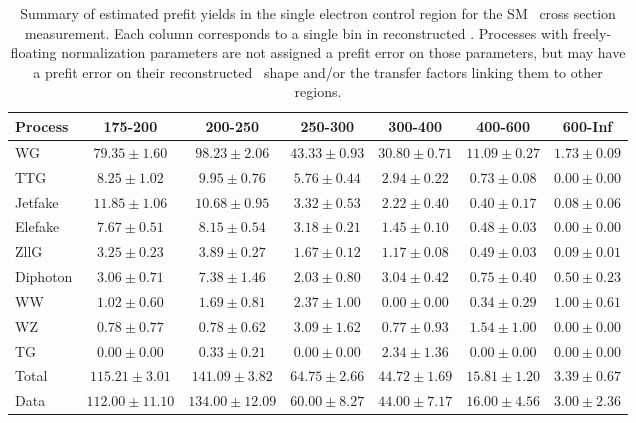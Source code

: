 \begin{table}[htbp]
  \begin{center}
    \caption{Summary of estimated prefit yields in the single electron control region for the SM \zinvg\ cross section measurement.
    Each column corresponds to a single bin in reconstructed \ETgamma. Processes with freely-floating normalization parameters
    are not assigned a prefit error on those parameters, but may have a prefit error on their reconstructed \ETgamma\ shape
    and/or the transfer factors linking them to other regions.}
    \label{tab:BkgSummaryMonoel_prefit}
    \begin{tabular}{|l|c|c|c|c|c|c|}
      \hline
      Process & 175-200 & 200-250 & 250-300 & 300-400 & 400-600 & 600-Inf \\
      \hline
      WG & $79.35{\pm}1.60$ & $98.23{\pm}2.06$ & $43.33{\pm}0.93$ & $30.80{\pm}0.71$ & $11.09{\pm}0.27$ & $1.73{\pm}0.09$ \\
      TTG & $8.25{\pm}1.02$ & $9.95{\pm}0.76$ & $5.76{\pm}0.44$ & $2.94{\pm}0.22$ & $0.73{\pm}0.08$ & $0.00{\pm}0.00$ \\
      Jetfake & $11.85{\pm}1.06$ & $10.68{\pm}0.95$ & $3.32{\pm}0.53$ & $2.22{\pm}0.40$ & $0.40{\pm}0.17$ & $0.08{\pm}0.06$ \\
      Elefake & $7.67{\pm}0.51$ & $8.15{\pm}0.54$ & $3.18{\pm}0.21$ & $1.45{\pm}0.10$ & $0.48{\pm}0.03$ & $0.00{\pm}0.00$ \\
      ZllG & $3.25{\pm}0.23$ & $3.89{\pm}0.27$ & $1.67{\pm}0.12$ & $1.17{\pm}0.08$ & $0.49{\pm}0.03$ & $0.09{\pm}0.01$ \\
      Diphoton & $3.06{\pm}0.71$ & $7.38{\pm}1.46$ & $2.03{\pm}0.80$ & $3.04{\pm}0.42$ & $0.75{\pm}0.40$ & $0.50{\pm}0.23$ \\
      WW & $1.02{\pm}0.60$ & $1.69{\pm}0.81$ & $2.37{\pm}1.00$ & $0.00{\pm}0.00$ & $0.34{\pm}0.29$ & $1.00{\pm}0.61$ \\
      WZ & $0.78{\pm}0.77$ & $0.78{\pm}0.62$ & $3.09{\pm}1.62$ & $0.77{\pm}0.93$ & $1.54{\pm}1.00$ & $0.00{\pm}0.00$ \\
      TG & $0.00{\pm}0.00$ & $0.33{\pm}0.21$ & $0.00{\pm}0.00$ & $2.34{\pm}1.36$ & $0.00{\pm}0.00$ & $0.00{\pm}0.00$ \\
      \hline
      Total & $115.21{\pm}3.01$ & $141.09{\pm}3.82$ & $64.75{\pm}2.66$ & $44.72{\pm}1.69$ & $15.81{\pm}1.20$ & $3.39{\pm}0.67$ \\
      \hline
      Data & $112.00{\pm}11.10$ & $134.00{\pm}12.09$ & $60.00{\pm}8.27$ & $44.00{\pm}7.17$ & $16.00{\pm}4.56$ & $3.00{\pm}2.36$ \\
      \hline
    \end{tabular}
  \end{center}
\end{table}

